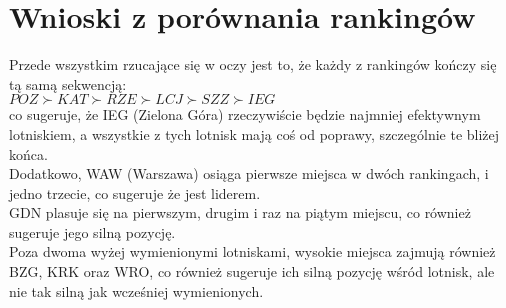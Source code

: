 \documentclass[a4paper,12pt]{article}
\begin{document}
\section{Wnioski z porównania rankingów}

    Przede wszystkim rzucające się w oczy jest to, że każdy z rankingów kończy się tą samą sekwencją:\\
    $POZ \succ KAT \succ RZE \succ LCJ \succ SZZ \succ IEG$ \\
    co sugeruje, że IEG (Zielona Góra) rzeczywiście będzie najmniej efektywnym lotniskiem, a wszystkie z tych lotnisk mają coś od poprawy, szczególnie te bliżej końca.\\

    Dodatkowo, WAW (Warszawa) osiąga pierwsze miejsca w dwóch rankingach, i jedno trzecie, co sugeruje że jest liderem.\\
    GDN plasuje się na pierwszym, drugim i raz na piątym miejscu, co również sugeruje jego silną pozycję.\\

    Poza dwoma wyżej wymienionymi lotniskami, wysokie miejsca zajmują również BZG, KRK oraz WRO, co również sugeruje ich silną pozycję wśród lotnisk, ale nie tak silną jak wcześniej wymienionych.
\end{document}
